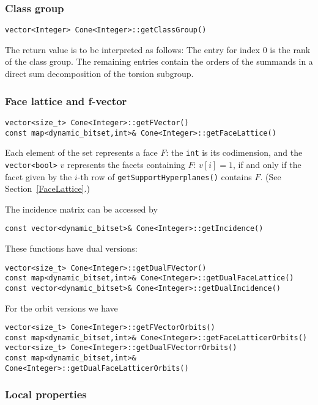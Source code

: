 \begin{small}
\subsubsection{Class group}

\begin{Verbatim}
vector<Integer> Cone<Integer>::getClassGroup()
\end{Verbatim}
The return value is to be interpreted as follows: The entry for index $0$ is the rank of the class group. The remaining entries contain the orders of the summands in a direct sum decomposition of the torsion subgroup.

\subsubsection{Face lattice and f-vector}
\begin{Verbatim}
vector<size_t> Cone<Integer>::getFVector()
const map<dynamic_bitset,int>& Cone<Integer>::getFaceLattice()
\end{Verbatim}
Each element of the set represents a face $F$: the \verb|int| is its codimension, and the \verb|vector<bool>| $v$ represents the facets containing $F$: $v[i]=1$, if and only if the facet given by the $i$-th row of \verb|getSupportHyperplanes()| contains $F$. (See Section~\ref{FaceLattice}.)

The incidence matrix can be accessed by

\begin{Verbatim}
const vector<dynamic_bitset>& Cone<Integer>::getIncidence()
\end{Verbatim}

These functions have dual versions:

\begin{Verbatim}
vector<size_t> Cone<Integer>::getDualFVector()
const map<dynamic_bitset,int>& Cone<Integer>::getDualFaceLattice()
const vector<dynamic_bitset>& Cone<Integer>::getDualIncidence()
\end{Verbatim}

For the orbit versions we have
\begin{Verbatim}
vector<size_t> Cone<Integer>::getFVectorOrbits()
const map<dynamic_bitset,int>& Cone<Integer>::getFaceLatticerOrbits()
vector<size_t> Cone<Integer>::getDualFVectorrOrbits()
const map<dynamic_bitset,int>& Cone<Integer>::getDualFaceLatticerOrbits()
\end{Verbatim}

\subsubsection{Local properties}


\end{small}
